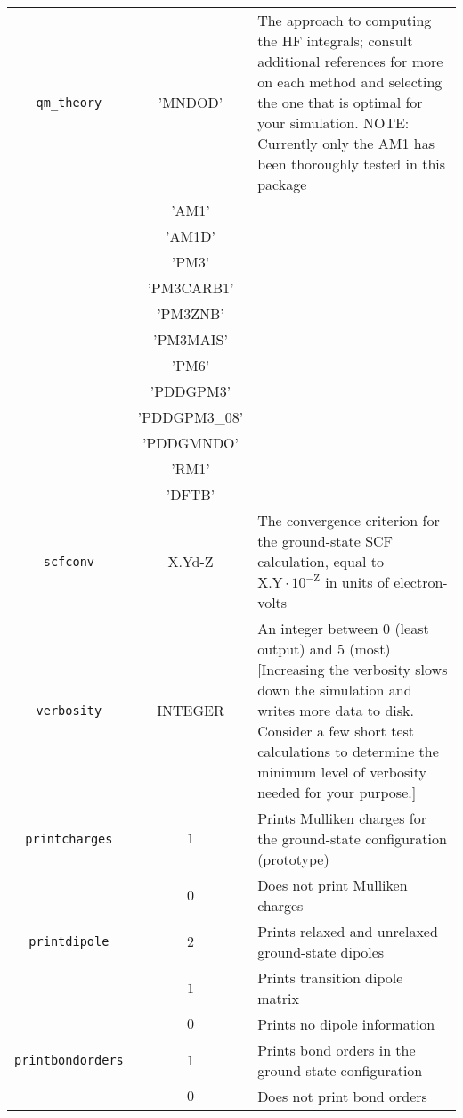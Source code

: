 \documentclass[12pt,letter,footinclude=true,headinclude=true,hyphens]{book} %
\begin{document}
    \begin{tabular}{ | c | c | p{7cm} | }
    \hline
    \texttt{qm\_theory} & 'MNDOD' & The approach to computing the HF integrals; consult additional references for more on each method and selecting the one that is optimal for your simulation. NOTE: Currently only the AM1 has been thoroughly tested in this package\\
    & 'AM1' & \\
    & 'AM1D' & \\
    & 'PM3' & \\
    & 'PM3CARB1' & \\
    & 'PM3ZNB' & \\
    & 'PM3MAIS' & \\
    & 'PM6' & \\
    & 'PDDGPM3' & \\
    & 'PDDGPM3\_08' & \\
    & 'PDDGMNDO' & \\
    & 'RM1' & \\
    & 'DFTB' & \\
    \hline
    \texttt{scfconv} & X.Yd-Z & The convergence criterion for the ground-state SCF calculation, equal to $\mathrm{X.Y} \cdot 10^{-\mathrm{Z}}$ in units of electron-volts \\
    \hline
    \texttt{verbosity} & INTEGER & An integer between 0 (least output) and 5 (most) [Increasing the verbosity slows down the simulation and writes more data to disk. Consider a few short test calculations to determine the minimum level of verbosity needed for your purpose.]\\
    \hline
    \texttt{printcharges} & $1$ & Prints Mulliken charges for the ground-state configuration (prototype) \\
    & $0$ & Does not print Mulliken charges \\
    \hline
    \texttt{printdipole} & $2$ & Prints relaxed and unrelaxed ground-state dipoles \\
    & $1$ & Prints transition dipole matrix \\
    & $0$ & Prints no dipole information \\ \hline
    \texttt{printbondorders} & $1$ & Prints bond orders in the ground-state configuration \\
    & $0$ & Does not print bond orders \\ \hline
    \end{tabular}
    
\end{document}
